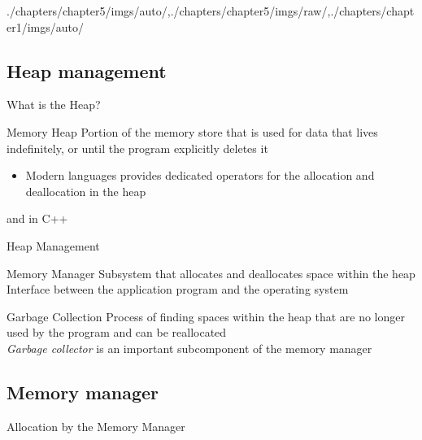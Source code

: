 \begin{graphicspathcontext}{{./chapters/chapter5/imgs/auto/},{./chapters/chapter5/imgs/raw/},{./chapters/chapter1/imgs/auto/}}
\begin{bibunit}[apalike]
\section{Heap management}
\sectiontableofcontentslide

\begin{frame}{What is the Heap?}
	\begin{definitionblock}{Memory Heap}
		Portion of the memory store that is used for data that lives indefinitely, or until the program explicitly deletes it
	\end{definitionblock}
	\vspace{.5cm}
	\begin{itemize}
		\item Modern languages provides dedicated operators for the allocation and deallocation in the heap
	\end{itemize}
	\vspace{.5cm}
	\begin{example}
		 and  in C++
	\end{example}
\end{frame}

\begin{frame}{Heap Management}
	\begin{definitionblock}{Memory Manager}
		Subsystem that allocates and deallocates space within the heap \\[.2cm]
		Interface between the application program and the operating system
	\end{definitionblock}
	\vspace{1cm}
	\begin{definitionblock}{Garbage Collection}
		Process of finding spaces within the heap that are no longer used by the program and can be reallocated \\[.2cm]
		\emph{Garbage collector} is an important subcomponent of the memory manager
	\end{definitionblock}
\end{frame}
\subsection{Memory manager}
\subsectiontableofcontentslide

\begin{frame}{Allocation by the Memory Manager}
	\begin{rightarrowsequence}
	\end{rightarrowsequence}
	\vspace{1cm}
\end{frame}


\end{bibunit}
\end{graphicspathcontext}
